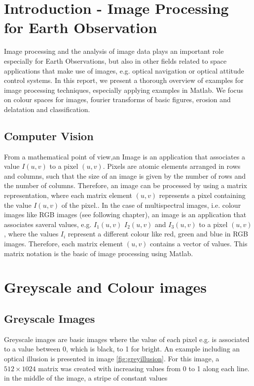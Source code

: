 \section{Introduction - Image Processing for Earth Observation}
Image processing and the analysis of image data plays an important role especially for Earth Observations, but also in other fields related to space applications that make use of images, e.g. optical navigation or optical attitude control systems. In this report, we present a thorough overview of examples for image processing techniques, especially applying examples in Matlab. We focus on colour spaces for images, fourier transforms of basic figures, erosion and delatation and classification. 

\subsection{Computer Vision}
From a mathematical point of view,an Image is an application that associates a value $I(u,v)$ to a pixel $(u,v)$. Pixels are atomic elements arranged in rows and columns,  such that the size of an image is given by the number of rows and the number of columns. Therefore, an image can be processed by using a matrix representation, where each matrix element $(u,v)$  represents a pixel containing the value $I(u,v)$ of the pixel.. In the case of multispectral images, i.e. colour images like RGB images (see following chapter), an image is an application that associates saveral values, e.g. $I_{1}(u,v)$ $I_{2}(u,v)$ and $I_{3}(u,v)$ to a pixel $(u,v)$, where the values $I_{i}$ represent a different colour like red, green and blue in RGB images. Therefore, each matrix element $(u,v)$ contains a vector of values. This matrix notation is the basic of image processing using Matlab.

\section{Greyscale and Colour images}
\subsection{Greyscale Images}
Greyscale images are basic images where the value of each pixel e.g. is associated to a value between 0, which is black, to 1 for bright. An example including an optical illusion is presented in image \ref{fig:greyillusion}. For this image, a $512\times 1024$ matrix was created with increasing values from 0 to 1 along each line. in the middle of the image, a stripe of  constant values %

